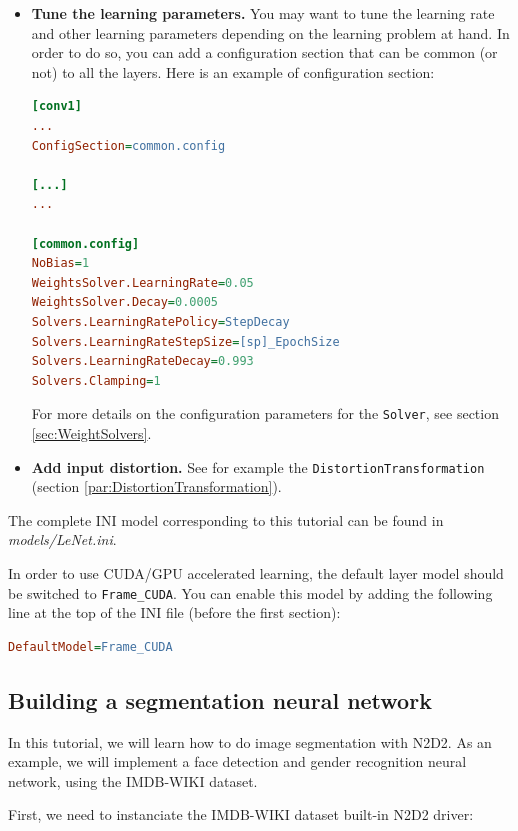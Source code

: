 \documentclass[a4paper,11pt,oneside]{article}
\newenvironment{myitemize}
{ \begin{itemize}
    \setlength{\itemsep}{0pt}
    \setlength{\parskip}{0pt}
    \setlength{\parsep}{0pt}     }
{ \end{itemize}                  }
\begin{document}
\begin{myitemize}
\begin{lstlisting}[language=ini]
[fc2]
Input=fc1.drop ; Replaces "Input=fc1"
...
\end{lstlisting}

\item \textbf{Tune the learning parameters.}
You may want to tune the learning rate and other learning parameters depending
on the learning problem at hand. In order to do so, you can add a configuration
section that can be common (or not) to all the layers. Here is an example of
configuration section:

\begin{lstlisting}[language=ini]
[conv1]
...
ConfigSection=common.config

[...]
...

[common.config]
NoBias=1
WeightsSolver.LearningRate=0.05
WeightsSolver.Decay=0.0005
Solvers.LearningRatePolicy=StepDecay
Solvers.LearningRateStepSize=[sp]_EpochSize
Solvers.LearningRateDecay=0.993
Solvers.Clamping=1
\end{lstlisting}

For more details on the configuration parameters for the \lstinline!Solver!, see
section \ref{sec:WeightSolvers}.

\item \textbf{Add input distortion.} See for example the
\lstinline!DistortionTransformation! (section
\ref{par:DistortionTransformation}).
\end{myitemize}

The complete INI model corresponding to this tutorial can be found in
\emph{models/LeNet.ini}.

In order to use CUDA/GPU accelerated learning, the default layer model should be
switched to \lstinline!Frame_CUDA!. You can enable this model by adding the
following line at the top of the INI file (before the first section):
\begin{lstlisting}[language=ini]
DefaultModel=Frame_CUDA
\end{lstlisting}

\subsection{Building a segmentation neural network}

In this tutorial, we will learn how to do image segmentation with N2D2. As an
example, we will implement a face detection and gender recognition neural
network, using the IMDB-WIKI dataset.

First, we need to instanciate the IMDB-WIKI dataset built-in N2D2 driver:
\end{document}
